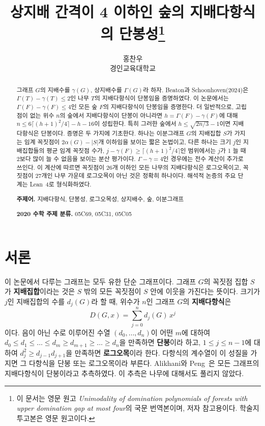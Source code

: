 \documentclass[11pt,a4paper]{article}
\title{\textbf{상지배 간격이 4 이하인 숲의 지배다항식의 단봉성}\thanks{이 문서는 영문 원고
\emph{Unimodality of domination polynomials of forests with upper domination gap at most four}의
국문 번역본이며, 저자 참고용이다. 학술지 투고본은 영문 원고이다.}}
\author{홍찬우\\ {\normalsize 경인교육대학교}\\ {\normalsize \texttt{\AuthorEmail}}}
\date{}
\theoremstyle{definition}
\newcommand{\MaxLC}{26}
\newcommand{\MinNonLC}{27}
\begin{document}
\maketitle

\begin{abstract}
그래프 $G$의 지배수를 $\gamma(G)$, 상지배수를 $\Gamma(G)$라 하자. Beaton과
Schoonhoven(2024)은 $\Gamma(T)-\gamma(T)\le2$인 나무 $T$의 지배다항식이 단봉임을
증명하였다. 이 논문에서는 $\Gamma(F)-\gamma(F)\le4$인 모든 숲 $F$의 지배다항식이
단봉임을 증명한다. 더 일반적으로, 고립점이 없는 위수 $n$의 숲에서 지배다항식이 단봉이
아니라면 $h=\Gamma(F)-\gamma(F)$에 대해 $n\le6\lceil(h+1)^2/4\rceil-h-16$이 성립한다.
특히 그러한 숲에서 $h\le\sqrt{2n/3}-1$이면 지배다항식은 단봉이다. 증명은 두 가지에
기초한다. 하나는 이분그래프 $G$의 지배집합 $S$가 가지는 임계 꼭짓점이
$2\alpha(G)-|S|$개 이하임을 보이는 짧은 논법이고, 다른 하나는 크기 $j$인 지배집합들의
평균 임계 꼭짓점 수가, $j-\gamma(F)\ge\lceil(h+1)^2/4\rceil$인 범위에서는 $j$가 1 늘 때 2보다 많이
늘 수 없음을 보이는 분산 평가이다.
$\Gamma-\gamma=4$인 경우에는 전수 계산이 추가로 쓰인다. 이 계산에 따르면 꼭짓점이
$\MaxLC$개 이하인 모든 나무의 지배다항식은 로그오목이고, 꼭짓점이 $\MinNonLC$개인 나무
가운데 로그오목이 아닌 것은 정확히 하나이다. 해석적 논증의 주요 단계는 Lean~4로
형식화하였다.

\medskip
\noindent\textbf{주제어.} 지배다항식, 단봉성, 로그오목성, 상지배수, 숲, 이분그래프

\noindent\textbf{2020 수학 주제 분류.} 05C69, 05C31, 05C05
\end{abstract}

\section{서론}\label{sec:intro}

이 논문에서 다루는 그래프는 모두 유한 단순 그래프이다. 그래프 $G$의 꼭짓점 집합
$S$가 \textbf{지배집합}이라는 것은 $S$ 밖의 모든 꼭짓점이 $S$ 안에 이웃을 가진다는
뜻이다. 크기가 $j$인 지배집합의 수를 $d_j(G)$라 할 때, 위수가 $n$인 그래프 $G$의
\textbf{지배다항식}은
\[
  D(G,x)=\sum_{j=0}^{n} d_j(G)\,x^j
\]
이다. 음이 아닌 수로 이루어진 수열 $(d_0,\dots,d_n)$이 어떤 $m$에 대하여
$d_0\le d_1\le\dots\le d_m\ge d_{m+1}\ge\dots\ge d_n$을 만족하면 \textbf{단봉}이라
하고, $1\le j\le n-1$에 대하여 $d_j^2\ge d_{j-1}d_{j+1}$을 만족하면
\textbf{로그오목}이라 한다. 다항식의 계수열이 이 성질을 가지면 그 다항식을 단봉 또는
로그오목이라 부른다. Alikhani와 Peng~\cite{AP}은 모든 그래프의 지배다항식이 단봉이라고
추측하였다. 이 추측은 나무에 대해서도 풀리지 않았다.
\end{document}
